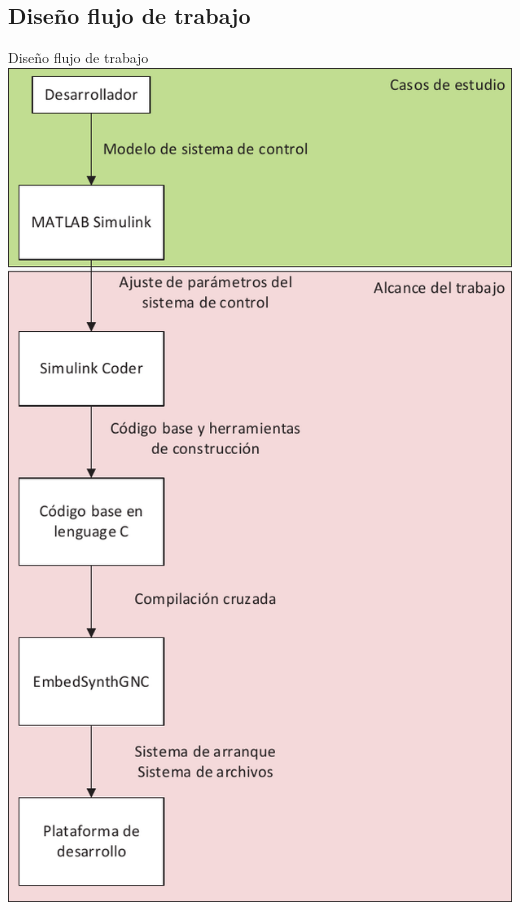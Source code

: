 \documentclass[10pt,aspectratio=169]{beamer} %
\begin{document}
\subsection{Diseño flujo de trabajo}

\begin{frame}{Diseño flujo de trabajo}
  \centering
  \includegraphics[scale=0.4]{Diagrama_general_del_proyecto/dgp_1.pdf}
\end{frame}
\end{document}
